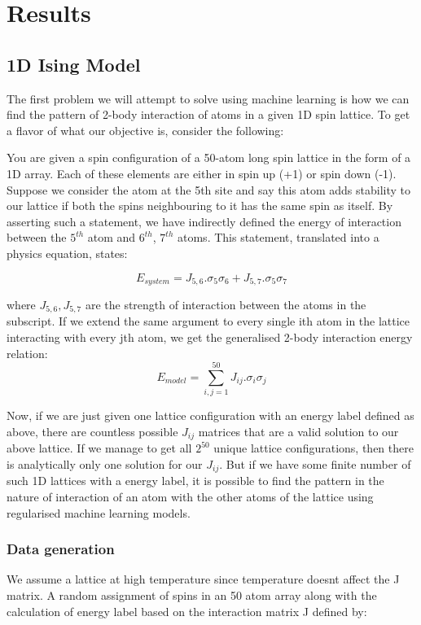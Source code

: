 \section{Results}

\subsection{1D Ising Model}

The first problem we will attempt to solve using machine learning is how we can find the pattern of 2-body interaction of atoms in a given 1D spin lattice.
To get a flavor of what our objective is, consider the following:

You are given a spin configuration of a 50-atom long spin lattice in the form of a 1D array.
Each of these elements are either in spin up (+1) or spin down (-1).
Suppose we consider the atom at the 5th site and say this atom adds stability to our lattice if both the spins neighbouring to it has the same spin as itself.
By asserting such a statement, we have indirectly defined the energy of interaction between the $5^{th}$ atom and $6^{th}$, $7^{th}$ atoms.
This statement, translated into a physics equation, states:

\[ E_{system}=J_{5,6}.\sigma_5\sigma_6+J_{5,7}.\sigma_5\sigma_7\]

where \(J_{5,6}, J_{5,7}\) are the strength of interaction between the atoms in the subscript.
If we extend the same argument to every single ith atom in the lattice interacting with every jth atom, we get the generalised 2-body interaction energy relation: \[E_{model}=\sum_{i,j=1}^{50}J_{ij}.\sigma_i\sigma_j\]

Now, if we are just given one lattice configuration with an energy label defined as above, there are countless possible \(J_{ij}\) matrices that are a valid solution to our above lattice.
If we manage to get all \(2^{50}\) unique lattice configurations, then there is analytically only one solution for our \(J_{ij}\).
But if we have some finite number of such 1D lattices with a energy label, it is possible to find the pattern in the nature of interaction of an atom with the other atoms of the lattice using regularised machine learning models.

\subsubsection{Data generation}

We assume a lattice at high temperature since temperature doesnt affect the J matrix.
A random assignment of spins in an 50 atom array along with the calculation of energy label based on the interaction matrix J defined by:

